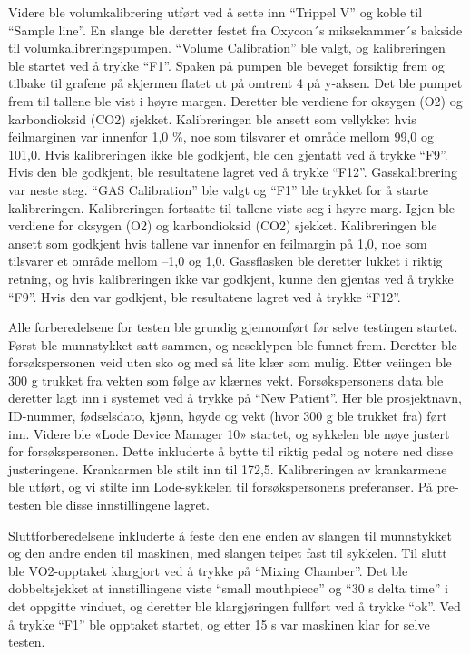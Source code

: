 \documentclass[
  letterpaper,
  DIV=11,
  numbers=noendperiod]{scrreprt}
\begin{document}
Videre ble volumkalibrering utført ved å sette inn ``Trippel V'' og
koble til ``Sample line''. En slange ble deretter festet fra Oxycon´s
miksekammer´s bakside til volumkalibreringspumpen. ``Volume
Calibration'' ble valgt, og kalibreringen ble startet ved å trykke
``F1''. Spaken på pumpen ble beveget forsiktig frem og tilbake til
grafene på skjermen flatet ut på omtrent 4 på y-aksen. Det ble pumpet
frem til tallene ble vist i høyre margen. Deretter ble verdiene for
oksygen (O2) og karbondioksid (CO2) sjekket. Kalibreringen ble ansett
som vellykket hvis feilmarginen var innenfor 1,0 \%, noe som tilsvarer
et område mellom 99,0 og 101,0. Hvis kalibreringen ikke ble godkjent,
ble den gjentatt ved å trykke ``F9''. Hvis den ble godkjent, ble
resultatene lagret ved å trykke ``F12''. Gasskalibrering var neste steg.
``GAS Calibration'' ble valgt og ``F1'' ble trykket for å starte
kalibreringen. Kalibreringen fortsatte til tallene viste seg i høyre
marg. Igjen ble verdiene for oksygen (O2) og karbondioksid (CO2)
sjekket. Kalibreringen ble ansett som godkjent hvis tallene var innenfor
en feilmargin på 1,0, noe som tilsvarer et område mellom --1,0 og 1,0.
Gassflasken ble deretter lukket i riktig retning, og hvis kalibreringen
ikke var godkjent, kunne den gjentas ved å trykke ``F9''. Hvis den var
godkjent, ble resultatene lagret ved å trykke ``F12''.

Alle forberedelsene for testen ble grundig gjennomført før selve
testingen startet. Først ble munnstykket satt sammen, og neseklypen ble
funnet frem. Deretter ble forsøkspersonen veid uten sko og med så lite
klær som mulig. Etter veiingen ble 300 g trukket fra vekten som følge av
klærnes vekt. Forsøkspersonens data ble deretter lagt inn i systemet ved
å trykke på ``New Patient''. Her ble prosjektnavn, ID-nummer,
fødselsdato, kjønn, høyde og vekt (hvor 300 g ble trukket fra) ført inn.
Videre ble «Lode Device Manager 10» startet, og sykkelen ble nøye
justert for forsøkspersonen. Dette inkluderte å bytte til riktig pedal
og notere ned disse justeringene. Krankarmen ble stilt inn til 172,5.
Kalibreringen av krankarmene ble utført, og vi stilte inn Lode-sykkelen
til forsøkspersonens preferanser. På pre-testen ble disse innstillingene
lagret.

Sluttforberedelsene inkluderte å feste den ene enden av slangen til
munnstykket og den andre enden til maskinen, med slangen teipet fast til
sykkelen. Til slutt ble VO2-opptaket klargjort ved å trykke på ``Mixing
Chamber''. Det ble dobbeltsjekket at innstillingene viste ``small
mouthpiece'' og ``30 s delta time'' i det oppgitte vinduet, og deretter
ble klargjøringen fullført ved å trykke ``ok''. Ved å trykke ``F1'' ble
opptaket startet, og etter 15 s var maskinen klar for selve testen.
\end{document}
